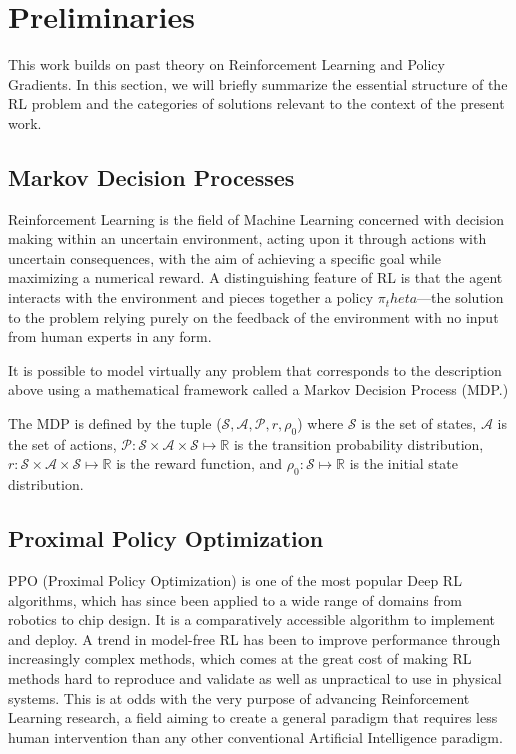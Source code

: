 \section{Preliminaries}
\label{sec:prelim}
This work builds on past theory on Reinforcement Learning and Policy Gradients. In this section, we will briefly summarize the essential structure of the RL problem and the categories of solutions relevant to the context of the present work.

\subsection{Markov Decision Processes}

Reinforcement Learning is the field of Machine Learning concerned with decision making within an uncertain environment, acting upon it through actions with uncertain consequences, with the aim of achieving a specific goal while maximizing a numerical reward. A distinguishing feature of RL is that the agent interacts with the environment and pieces together a policy $\pi_theta$—the solution to the problem relying purely on the feedback of the environment with no input from human experts in any form. 

It is possible to model virtually any problem that corresponds to the description above using a mathematical framework called a Markov Decision Process (MDP.) 

The MDP is defined by the tuple ($\mathcal{S}, \mathcal{A}, \mathcal{P}, r, \rho_0$) where $\mathcal{S}$ is the set of states, $\mathcal{A}$ is the set of actions, $\mathcal{P}: \mathcal{S}\times\mathcal{A}\times\mathcal{S}\mapsto \mathbb{R}$ is the transition probability distribution, $r: \mathcal{S}\times\mathcal{A}\times\mathcal{S} \mapsto \mathbb{R}$ is the reward function, and $\rho_0:\mathcal{S}\mapsto\mathbb{R}$ is the initial state distribution.


\subsection{Proximal Policy Optimization}

PPO (Proximal Policy Optimization\cite{schulman2017proximal}) is one of the most popular Deep RL algorithms, which has since been applied to a wide range of domains from robotics\cite{andrychowicz2020learning} to chip design\cite{mirhoseini2021graph}. It is a comparatively accessible algorithm to implement and deploy. A trend in model-free RL has been to improve performance through increasingly complex methods, which comes at the great cost of making RL methods hard to reproduce and validate as well as unpractical to use in physical systems. This is at odds with the very purpose of advancing Reinforcement Learning research, a field aiming to create a general paradigm that requires less human intervention than any other conventional Artificial Intelligence paradigm. 
